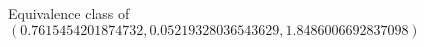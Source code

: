 \documentclass[preview]{standalone}
\begin{document}
\begin{center}
Equivalence class of $(0.7615454201874732, 0.05219328036543629, 1.8486006692837098)$
\end{center}
\end{document}
